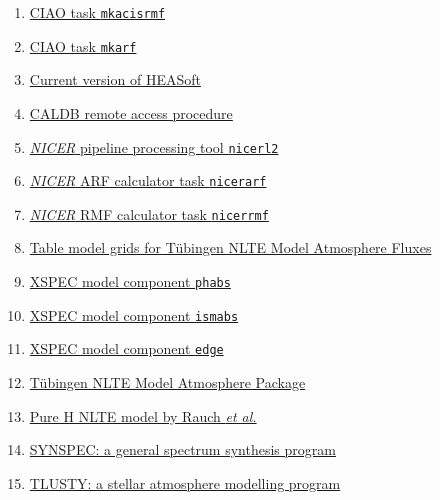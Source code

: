 \begin{enumerate}[1]
		\item \href{https://cxc.cfa.harvard.edu/ciao/ahelp/mkacisrmf.html}{CIAO task \texttt{mkacisrmf}}
		\item \href{https://cxc.cfa.harvard.edu/ciao/ahelp/mkarf.html}{CIAO task \texttt{mkarf}}
		\item \href{https://heasarc.gsfc.nasa.gov/docs/software/heasoft/}{Current version of HEASoft}
		\item \href{https://heasarc.gsfc.nasa.gov/docs/heasarc/caldb/caldb_remote_access.html}{CALDB remote access procedure}
		\item \href{https://heasarc.gsfc.nasa.gov/lheasoft/ftools/headas/nicerl2.html}{\textit{NICER} pipeline processing tool \texttt{nicerl2}}
		\item \href{https://heasarc.gsfc.nasa.gov/lheasoft/ftools/headas/nicerarf.html}{\textit{NICER} ARF calculator task \texttt{nicerarf}}
		\item \href{https://heasarc.gsfc.nasa.gov/lheasoft/ftools/headas/nicerrmf.html}{\textit{NICER} RMF calculator task \texttt{nicerrmf}}
		\item \href{http://astro.uni-tuebingen.de/~rauch/TMAF/TMAF.html}{Table model grids for T\"{u}bingen NLTE Model Atmosphere Fluxes}
		\item \href{https://heasarc.gsfc.nasa.gov/xanadu/xspec/manual/XSmodelPhabs.html}{XSPEC model component \texttt{phabs}}
		\item \href{https://heasarc.gsfc.nasa.gov/xanadu/xspec/manual/node255.html}{XSPEC model component \texttt{ismabs}}
		\item \href{https://heasarc.gsfc.nasa.gov/xanadu/xspec/manual/node247.html}{XSPEC model component \texttt{edge}}
		\item \href{http://astro.uni-tuebingen.de/~rauch/TMAP/TMAP.html}{T\"{u}bingen NLTE Model Atmosphere Package}
		\item \href{http://astro.uni-tuebingen.de/~rauch/TMAF/flux_H.html}{Pure H NLTE model by Rauch \textit{et al.}}
		\item \href{http://tlusty.oca.eu/Synspec49/synspec.html}{SYNSPEC: a general spectrum synthesis program}
		\item \href{http://tlusty.oca.eu/}{TLUSTY: a stellar atmosphere modelling program}
	\end{enumerate}